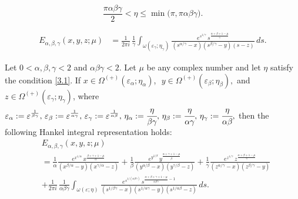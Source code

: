 \documentclass[10pt,a4paper]{amsart}
\begin{document}
\begin{equation}\label{3.1}
\frac{\pi\alpha\beta\gamma}{2}
<
\eta
\leq
\min\!\bigl(\pi,\pi\alpha\beta\gamma\bigr).
\end{equation}

\begin{equation}\label{1.3}
\begin{aligned}
E_{\alpha,\beta,\gamma}(x,y,z;\mu)
&=
\frac{1}{2\pi i}\,
\frac{1}{\gamma}
\int_{\omega(\varepsilon_\gamma;\eta_\gamma)}
\frac{
e^{s^{1/\gamma}}
\,s^{\frac{\alpha+\beta+1-\mu}{\gamma}}
}
{
(s^{\alpha/\gamma}-x)(s^{\beta/\gamma}-y)(s-z)
}
\,ds.
\end{aligned}\end{equation}

\begin{lemma}\label{l3.2}
     Let $0 < \alpha, \beta,\gamma < 2$ and $\alpha\beta\gamma < 2$. Let $\mu$ be any complex number and let $\eta$ satisfy the condition \eqref{3.1}.
If
$
x \in \Omega^{(+)}({\varepsilon}_\alpha;\eta_\alpha)
$,\,\, 
$y \in \Omega^{(+)}({\varepsilon}_\beta;\eta_\beta),
$ and $z \in \Omega^{(+)}({\varepsilon}_\gamma;\eta_\gamma)
$,
where
$
{\varepsilon}_\alpha:={\varepsilon}^{\frac{1}{\beta\gamma}},\,
{\varepsilon}_\beta:={\varepsilon}^{\frac{1}{\alpha\gamma}}, \,{\varepsilon}_\gamma:={\varepsilon}^{\frac{1}{\alpha\beta}},\,
\eta_\alpha:=\cfrac{{\eta}}{\beta\gamma},\,
\eta_\beta:=\cfrac{{\eta}}{\alpha\gamma},\,
\eta_\gamma:=\cfrac{{\eta}}{\alpha\beta},
$
then the following Hankel integral representation holds:
\begin{equation}\label{3.9}\begin{aligned}
&E_{\alpha,\beta,\gamma}(x,y,z;\mu)\\
&=\frac{1}{\alpha}\frac{
e^{x^{1/\alpha}}
\,x^{\frac{\beta+\gamma+1-\mu}{\alpha}}}
{(x^{\beta/\alpha}-y)(x^{\gamma/\alpha}-z)}+\frac{1}{\beta}\frac{
e^{y^{1/\beta}}
\,y^{\frac{\alpha+\gamma+1-\mu}{\beta}}}
{(y^{\alpha/\beta}-x)(y^{\gamma/\beta}-z)}+\frac{1}{\gamma}
\frac{
e^{z^{1/\gamma}}
\,z^{\frac{\alpha+\beta+1-\mu}{\gamma}}}
{(z^{\alpha/\gamma}-x)(z^{\beta/\gamma}-y)}\\
&+
\frac{1}{2\pi i}\,
\frac{1}{\alpha\beta\gamma}
\int_{\omega(\varepsilon;\eta)}
\frac{
e^{s^{1/(\alpha\beta\gamma)}}
\,s^{\frac{\alpha+\beta+\gamma+1-\mu}{\alpha\beta\gamma}-1}
}
{
(s^{1/\beta\gamma}-x)(s^{1/\alpha\gamma}-y)(s^{1/\alpha\beta}-z)
}
\,ds.\end{aligned}
\end{equation}
\end{lemma}
\end{document}

